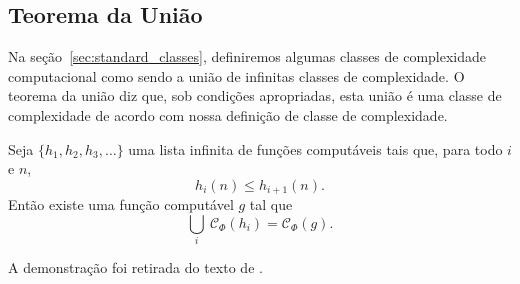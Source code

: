 \subsection{Teorema da União}

Na seção~\ref{sec:standard_classes},
definiremos algumas classes de complexidade computacional
como sendo a união de infinitas classes de complexidade.
O teorema da união diz que,
sob condições apropriadas,
esta união é uma classe de complexidade
de acordo com nossa definição de classe de complexidade.

\begin{theorem}
    \label{thm:union}
    Seja $\{h_1, h_2, h_3, \dots\}$ uma lista infinita de funções computáveis
    tais que, para todo $i$ e $n$,
    \begin{equation*}
        h_i(n) \leq h_{i+1}(n).
    \end{equation*}
    Então existe uma função computável $g$
    tal que
    \begin{equation*}
        \bigcup_i \ \mathcal C_\Phi(h_i) = \mathcal C_\Phi(g).
    \end{equation*}
\end{theorem}

A demonstração foi retirada do texto de .

